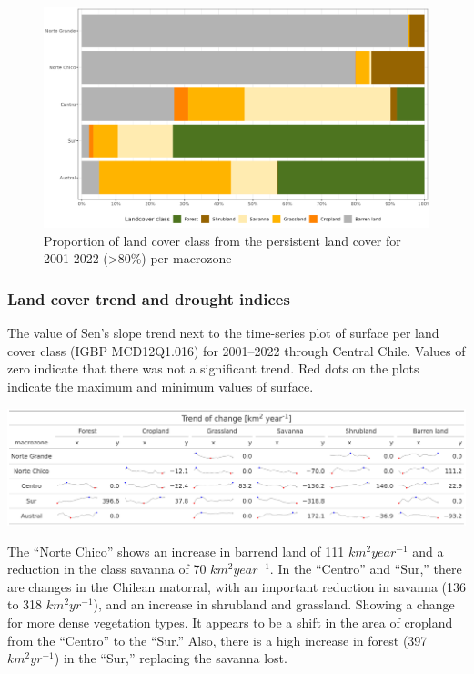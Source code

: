 \documentclass[
  authoryear,
  preprint,
  3p,
  onecolumn]{elsarticle}
\begin{document}
\begin{figure}[!ht]

{\centering \includegraphics{../output/figs/LC_pers80_per_macrozone.png}

}

\caption{\label{fig-LCprop}Proportion of land cover class from the
persistent land cover for 2001-2022 (\textgreater80\%) per macrozone}

\end{figure}

\hypertarget{land-cover-trend-and-drought-indices-1}{%
\subsubsection{Land cover trend and drought
indices}\label{land-cover-trend-and-drought-indices-1}}

\begin{table}[!ht]
\caption{The value of Sen's slope trend next to the time-series plot of surface per land cover class (IGBP MCD12Q1.016) for 2001–2022 through Central Chile. Values of zero indicate that there was not a significant trend. Red dots on the plots indicate the maximum and minimum values of surface.}
\label{tab-landcoverTrend}
\includegraphics[]{../output/figs/table_var_landcover_macro.png}
\end{table}

The ``Norte Chico'' shows an increase in barrend land of 111
\(km^2 year^{-1}\) and a reduction in the class savanna of 70
\(km^2 year^{-1}\). In the ``Centro'' and ``Sur,'' there are changes in
the Chilean matorral, with an important reduction in savanna (136 to 318
\(km^2 yr^{-1}\)), and an increase in shrubland and grassland. Showing a
change for more dense vegetation types. It appears to be a shift in the
area of cropland from the ``Centro'' to the ``Sur.'' Also, there is a
high increase in forest (397 \(km^2 yr^{-1}\)) in the ``Sur,'' replacing
the savanna lost.
\end{document}
